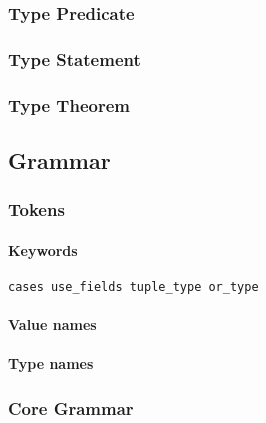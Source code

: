 \documentclass{article}
\begin{document}
\subsubsection{Type Predicate}

\subsubsection{Type Statement}

\subsubsection{Type Theorem}

\subsection{Grammar}
\subsubsection{Tokens}

\paragraph{Keywords}

\begin{verbatim}
cases use_fields tuple_type or_type
\end{verbatim}

\paragraph{Value names}

\paragraph{Type names}

\subsubsection{Core Grammar}

\setlength{\grammarparsep}{20pt}
\setlength{\grammarindent}{12em}
\end{document}
